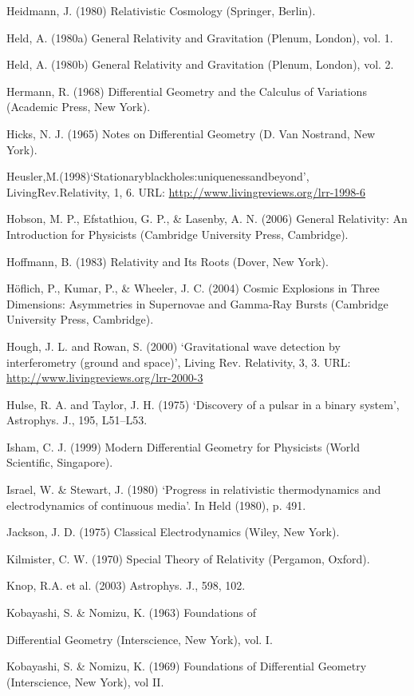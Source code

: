{Heidmann, J. (1980) Relativistic Cosmology (Springer, Berlin).


Held, A. (1980a) General Relativity and Gravitation (Plenum, London), vol. 1.


Held, A. (1980b) General Relativity and Gravitation (Plenum, London), vol. 2.


Hermann, R. (1968) Differential Geometry and the Calculus of Variations (Academic Press, New York).


Hicks, N. J. (1965) Notes on Differential Geometry (D. Van Nostrand, New York).


Heusler,M.(1998)‘Stationaryblackholes:uniquenessandbeyond’, LivingRev.Relativity, 1, 6. URL: \url{http://www.livingreviews.org/lrr-1998-6}


Hobson, M. P., Efstathiou, G. P., \& Lasenby, A. N. (2006) General Relativity: An Introduction for Physicists (Cambridge University Press, Cambridge).


Hoffmann, B. (1983) Relativity and Its Roots (Dover, New York).


Höflich, P., Kumar, P., \& Wheeler, J. C. (2004) Cosmic Explosions in Three Dimensions: Asymmetries in Supernovae and Gamma-Ray Bursts (Cambridge University Press,
Cambridge).


Hough, J. L. and Rowan, S. (2000) ‘Gravitational wave detection by interferometry (ground and space)’, Living Rev. Relativity, 3, 3. URL: \url{http://www.livingreviews.org/lrr-2000-3}


Hulse, R. A. and Taylor, J. H. (1975) ‘Discovery of a pulsar in a binary system’, Astrophys. J., 195, L51–L53.


Isham, C. J. (1999) Modern Differential Geometry for Physicists (World Scientific, Singapore).


Israel, W. \& Stewart, J. (1980) ‘Progress in relativistic thermodynamics and electrodynamics of continuous media’. In Held (1980), p. 491.


Jackson, J. D. (1975) Classical Electrodynamics (Wiley, New York).


Kilmister, C. W. (1970) Special Theory of Relativity (Pergamon, Oxford).


Knop, R.A. et al. (2003) Astrophys. J., 598, 102.


Kobayashi, S. \& Nomizu, K. (1963) Foundations of 

Differential Geometry (Interscience, New York), vol. I.


Kobayashi, S. \& Nomizu, K. (1969) Foundations of Differential Geometry (Interscience, New York), vol II.


}
